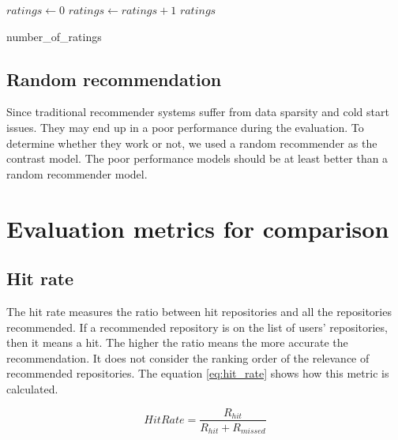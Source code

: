 \documentclass[11pt,twoside]{report}
\begin{document}
\begin{algorithm}[H]
    \DontPrintSemicolon
    

    $ratings \leftarrow 0$ \newline
    {
        {
            $ratings \leftarrow ratings + 1$
        }
    }
    \Return $ratings$
    
    \caption{number\_of\_ratings}
    \label{alg:ratings}
\end{algorithm}


\subsection{Random recommendation}
Since traditional recommender systems suffer from data sparsity and cold start issues. They may end up in a poor performance during the evaluation. To determine whether they work or not, we used a random recommender as the contrast model. The poor performance models should be at least better than a random recommender model.

\section{Evaluation metrics for comparison}
\subsection{Hit rate}
The hit rate measures the ratio between hit repositories and all the repositories recommended. If a recommended repository is on the list of users' repositories, then it means a hit. The higher the ratio means the more accurate the recommendation. It does not consider the ranking order of the relevance of recommended repositories. The equation \ref{eq:hit_rate} shows how this metric is calculated.

\begin{equation}
    HitRate=\frac{R_{hit}}{R_{hit}+R_{missed}}
    \label{eq:hit_rate}
\end{equation}
\end{document}
